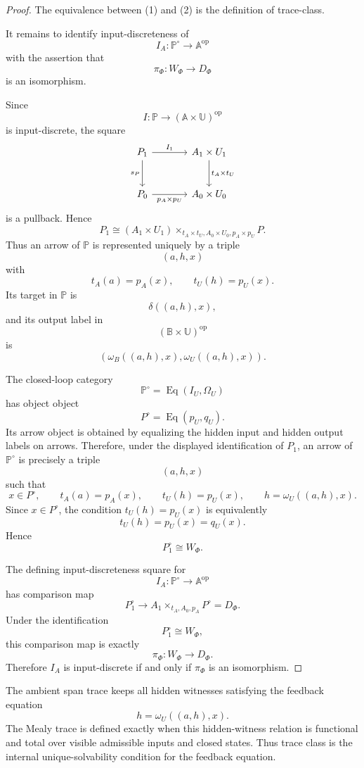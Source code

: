 \begin{proof}
The equivalence between (1) and (2) is the definition of trace-class.

It remains to identify input-discreteness of
\[
I_A:\mathbb P^\circ\to\mathbb A^{\mathrm{op}}
\]
with the assertion that
\[
\pi_\Phi:W_\Phi\to D_\Phi
\]
is an isomorphism.

Since
\[
I:\mathbb P\to(\mathbb A\times\mathbb U)^{\mathrm{op}}
\]
is input-discrete, the square
\[
\begin{tikzcd}[column sep=large,row sep=large]
P_1
  \arrow[r, "I_1"]
  \arrow[d, "s_P"']
&
A_1\times U_1
  \arrow[d, "t_A\times t_U"]
\\
P_0
  \arrow[r, "p_A\times p_U"']
&
A_0\times U_0
\end{tikzcd}
\]
is a pullback.  Hence
\[
P_1
\cong
(A_1\times U_1)
\times_{t_A\times t_U,A_0\times U_0,p_A\times p_U}
P.
\]
Thus an arrow of \(\mathbb P\) is represented uniquely by a triple
\[
(a,h,x)
\]
with
\[
t_A(a)=p_A(x),
\qquad
t_U(h)=p_U(x).
\]
Its target in \(\mathbb P\) is
\[
\delta((a,h),x),
\]
and its output label in
\[
(\mathbb B\times\mathbb U)^{\mathrm{op}}
\]
is
\[
(\omega_B((a,h),x),\omega_U((a,h),x)).
\]

The closed-loop category
\[
\mathbb P^\circ=\operatorname{Eq}(I_U,\Omega_U)
\]
has object object
\[
P^\circ=\operatorname{Eq}(p_U,q_U).
\]
Its arrow object is obtained by equalizing the hidden input and hidden output
labels on arrows.  Therefore, under the displayed identification of \(P_1\),
an arrow of \(\mathbb P^\circ\) is precisely a triple
\[
(a,h,x)
\]
such that
\[
x\in P^\circ,
\qquad
t_A(a)=p_A(x),
\qquad
t_U(h)=p_U(x),
\qquad
h=\omega_U((a,h),x).
\]
Since \(x\in P^\circ\), the condition \(t_U(h)=p_U(x)\) is equivalently
\[
t_U(h)=p_U(x)=q_U(x).
\]
Hence
\[
P^\circ_1\cong W_\Phi.
\]

The defining input-discreteness square for
\[
I_A:\mathbb P^\circ\to\mathbb A^{\mathrm{op}}
\]
has comparison map
\[
P^\circ_1
\longrightarrow
A_1\times_{t_A,A_0,p_A}P^\circ
=
D_\Phi.
\]
Under the identification
\[
P^\circ_1\cong W_\Phi,
\]
this comparison map is exactly
\[
\pi_\Phi:W_\Phi\to D_\Phi.
\]
Therefore \(I_A\) is input-discrete if and only if
\(\pi_\Phi\) is an isomorphism.
\end{proof}

\begin{remark}
\label{rem:trace-class-unique-feedback}
The ambient span trace keeps all hidden witnesses satisfying the feedback
equation
\[
h=\omega_U((a,h),x).
\]
The Mealy trace is defined exactly when this hidden-witness relation is
functional and total over visible admissible inputs and closed states.  Thus
trace class is the internal unique-solvability condition for the feedback
equation.
\end{remark}

